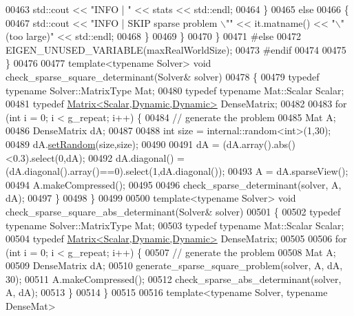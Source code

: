 \begin{DoxyCode}
00463           std::cout << \textcolor{stringliteral}{"INFO |  "} << stats << std::endl;
00464       \}
00465       \textcolor{keywordflow}{else}
00466       \{
00467         std::cout << \textcolor{stringliteral}{"INFO | SKIP sparse problem \(\backslash\)""} << it.matname() << \textcolor{stringliteral}{"\(\backslash\)" (too large)"} << std::endl;
00468       \}
00469     \}
00470   \}
00471 \textcolor{preprocessor}{#else}
00472   EIGEN\_UNUSED\_VARIABLE(maxRealWorldSize);
00473 \textcolor{preprocessor}{#endif}
00474 
00475 \}
00476 
00477 \textcolor{keyword}{template}<\textcolor{keyword}{typename} Solver> \textcolor{keywordtype}{void} check\_sparse\_square\_determinant(Solver& solver)
00478 \{
00479   \textcolor{keyword}{typedef} \textcolor{keyword}{typename} Solver::MatrixType Mat;
00480   \textcolor{keyword}{typedef} \textcolor{keyword}{typename} Mat::Scalar Scalar;
00481   \textcolor{keyword}{typedef} \hyperlink{group___core___module}{Matrix<Scalar,Dynamic,Dynamic>} DenseMatrix;
00482   
00483   \textcolor{keywordflow}{for} (\textcolor{keywordtype}{int} i = 0; i < g\_repeat; i++) \{
00484     \textcolor{comment}{// generate the problem}
00485     Mat A;
00486     DenseMatrix dA;
00487     
00488     \textcolor{keywordtype}{int} size = internal::random<int>(1,30);
00489     dA.\hyperlink{class_eigen_1_1_plain_object_base_af0e576a0e1aefc9ee346de44cc352ba3}{setRandom}(size,size);
00490     
00491     dA = (dA.array().abs()<0.3).select(0,dA);
00492     dA.diagonal() = (dA.diagonal().array()==0).select(1,dA.diagonal());
00493     A = dA.sparseView();
00494     A.makeCompressed();
00495   
00496     check\_sparse\_determinant(solver, A, dA);
00497   \}
00498 \}
00499 
00500 \textcolor{keyword}{template}<\textcolor{keyword}{typename} Solver> \textcolor{keywordtype}{void} check\_sparse\_square\_abs\_determinant(Solver& solver)
00501 \{
00502   \textcolor{keyword}{typedef} \textcolor{keyword}{typename} Solver::MatrixType Mat;
00503   \textcolor{keyword}{typedef} \textcolor{keyword}{typename} Mat::Scalar Scalar;
00504   \textcolor{keyword}{typedef} \hyperlink{group___core___module}{Matrix<Scalar,Dynamic,Dynamic>} DenseMatrix;
00505 
00506   \textcolor{keywordflow}{for} (\textcolor{keywordtype}{int} i = 0; i < g\_repeat; i++) \{
00507     \textcolor{comment}{// generate the problem}
00508     Mat A;
00509     DenseMatrix dA;
00510     generate\_sparse\_square\_problem(solver, A, dA, 30);
00511     A.makeCompressed();
00512     check\_sparse\_abs\_determinant(solver, A, dA);
00513   \}
00514 \}
00515 
00516 \textcolor{keyword}{template}<\textcolor{keyword}{typename} Solver, \textcolor{keyword}{typename} DenseMat>

\end{DoxyCode}
